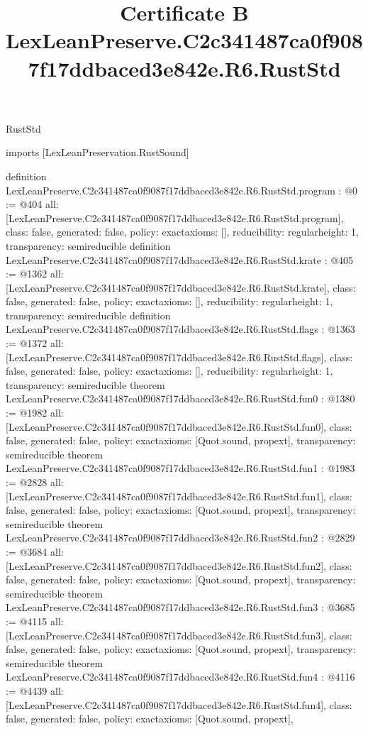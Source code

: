 \begin{lexlean}{RustStd}
\title{Certificate B LexLeanPreserve.C2c341487ca0f9087f17ddbaced3e842e.R6.RustStd}
\begin{coremodule}
imports [LexLeanPreservation.RustSound]

definition LexLeanPreserve.C2c341487ca0f9087f17ddbaced3e842e.R6.RustStd.program : @0 := @404 {
  all: [LexLeanPreserve.C2c341487ca0f9087f17ddbaced3e842e.R6.RustStd.program],
  class: false,
  generated: false,
  policy: exact{axioms: []},
  reducibility: regular{height: 1},
  transparency: semireducible
}
definition LexLeanPreserve.C2c341487ca0f9087f17ddbaced3e842e.R6.RustStd.krate : @405 := @1362 {
  all: [LexLeanPreserve.C2c341487ca0f9087f17ddbaced3e842e.R6.RustStd.krate],
  class: false,
  generated: false,
  policy: exact{axioms: []},
  reducibility: regular{height: 1},
  transparency: semireducible
}
definition LexLeanPreserve.C2c341487ca0f9087f17ddbaced3e842e.R6.RustStd.flags : @1363 := @1372 {
  all: [LexLeanPreserve.C2c341487ca0f9087f17ddbaced3e842e.R6.RustStd.flags],
  class: false,
  generated: false,
  policy: exact{axioms: []},
  reducibility: regular{height: 1},
  transparency: semireducible
}
theorem LexLeanPreserve.C2c341487ca0f9087f17ddbaced3e842e.R6.RustStd.fun0 : @1380 := @1982 {
  all: [LexLeanPreserve.C2c341487ca0f9087f17ddbaced3e842e.R6.RustStd.fun0],
  class: false,
  generated: false,
  policy: exact{axioms: [Quot.sound, propext]},
  transparency: semireducible
}
theorem LexLeanPreserve.C2c341487ca0f9087f17ddbaced3e842e.R6.RustStd.fun1 : @1983 := @2828 {
  all: [LexLeanPreserve.C2c341487ca0f9087f17ddbaced3e842e.R6.RustStd.fun1],
  class: false,
  generated: false,
  policy: exact{axioms: [Quot.sound, propext]},
  transparency: semireducible
}
theorem LexLeanPreserve.C2c341487ca0f9087f17ddbaced3e842e.R6.RustStd.fun2 : @2829 := @3684 {
  all: [LexLeanPreserve.C2c341487ca0f9087f17ddbaced3e842e.R6.RustStd.fun2],
  class: false,
  generated: false,
  policy: exact{axioms: [Quot.sound, propext]},
  transparency: semireducible
}
theorem LexLeanPreserve.C2c341487ca0f9087f17ddbaced3e842e.R6.RustStd.fun3 : @3685 := @4115 {
  all: [LexLeanPreserve.C2c341487ca0f9087f17ddbaced3e842e.R6.RustStd.fun3],
  class: false,
  generated: false,
  policy: exact{axioms: [Quot.sound, propext]},
  transparency: semireducible
}
theorem LexLeanPreserve.C2c341487ca0f9087f17ddbaced3e842e.R6.RustStd.fun4 : @4116 := @4439 {
  all: [LexLeanPreserve.C2c341487ca0f9087f17ddbaced3e842e.R6.RustStd.fun4],
  class: false,
  generated: false,
  policy: exact{axioms: [Quot.sound, propext]},
}
\end{coremodule}
\end{lexlean}
